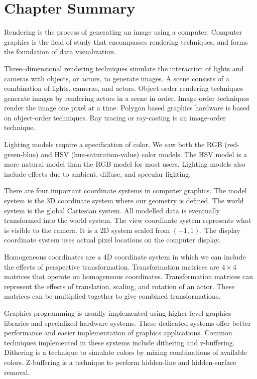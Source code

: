 \section{Chapter Summary}

Rendering is the process of generating an image using a computer. Computer graphics is the field of study that encompasses rendering techniques, and forms the foundation of data visualization.

Three--dimensional rendering techniques simulate the interaction of lights and cameras with objects, or actors, to generate images. A scene consists of a combination of lights, cameras, and actors. Object-order rendering techniques generate images by rendering actors in a scene in order. Image-order techniques render the image one pixel at a time. Polygon based graphics hardware is based on object-order techniques. Ray tracing or ray-casting is an image-order technique.

Lighting models require a specification of color. We saw both the RGB (red-green-blue) and HSV (hue-saturation-value) color models. The HSV model is a more natural model than the RGB model for most users. Lighting models also include effects due to ambient, diffuse, and specular lighting.

There are four important coordinate systems in computer graphics. The model system is the 3D coordinate system where our geometry is defined. The world system is the global Cartesian system. All modelled data is eventually transformed into the world system. The view coordinate system represents what is visible to the camera. It is a 2D system scaled from $(-1,1)$. The display coordinate system uses actual pixel locations on the computer display.

Homogeneous coordinates are a 4D coordinate system in which we can include the effects of perspective transformation. Transformation matrices are \(4 \times 4\) matrices that operate on homogeneous coordinates. Transformation matrices can represent the effects of translation, scaling, and rotation of an actor. These matrices can be multiplied together to give combined transformations.

Graphics programming is usually implemented using higher-level graphics libraries and specialized hardware systems. These dedicated systems offer better performance and easier implementation of graphics applications. Common techniques implemented in these systems include dithering and z-buffering. Dithering is a technique to simulate colors by mixing combinations of available colors. Z-buffering is a technique to perform hidden-line and hidden-surface removal.

